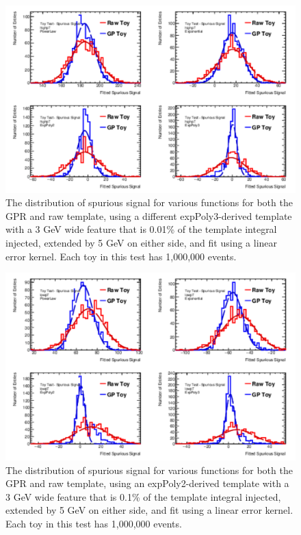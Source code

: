 \begin{figure} 
\begin{center}
  \includegraphics[width=\textwidth]{figures/background/gpr/validation/linear/ToyTest_FitSigVals_highpT_100_Siginj}   
\caption{The distribution of spurious signal for various functions for both the GPR and raw template, using a different expPoly3-derived template with a 3 GeV wide feature that is 0.01\% of the template integral injected, extended by 5 GeV on either side, and fit using a linear error kernel. Each toy in this test has 1,000,000 events.}
\label{fig:linearkernel_highpt_100_Siginj}
\end{center}
\end{figure}

\begin{figure}  
\begin{center}
  \includegraphics[width=\textwidth]{figures/background/gpr/validation/linear/ToyTest_FitSigVals_lowpT_1k_Siginj}   
\caption{The distribution of spurious signal for various functions for both the GPR and raw template, using an expPoly2-derived template with a 3 GeV wide feature that is 0.1\% of the template integral injected, extended by 5 GeV on either side, and fit using a linear error kernel. Each toy in this test has 1,000,000 events.}
\label{fig:linearkernel_lowpt_1k_Siginj}
\end{center}
\end{figure}

